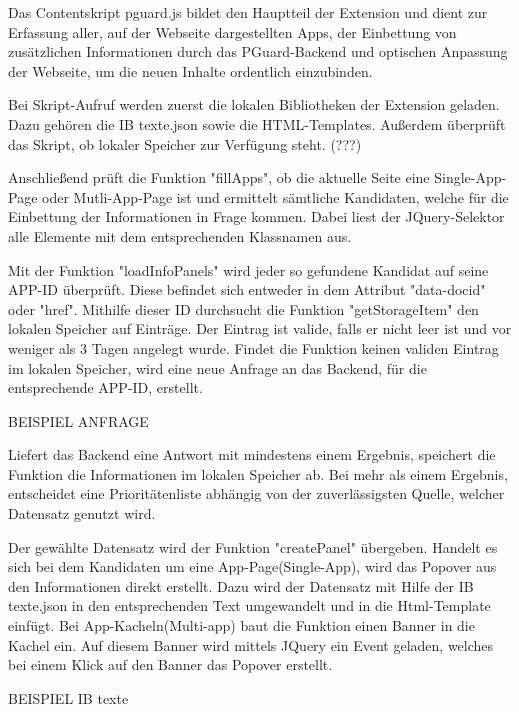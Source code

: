 

Das Contentskript pguard.js bildet den Hauptteil der Extension und dient zur Erfassung aller, auf der Webseite dargestellten Apps, der Einbettung von zusätzlichen Informationen durch das PGuard-Backend und optischen Anpassung der Webseite, um die neuen Inhalte ordentlich einzubinden.

Bei Skript-Aufruf werden zuerst die lokalen Bibliotheken der Extension geladen. Dazu gehören die IB texte.json sowie die HTML-Templates. Außerdem überprüft das Skript, ob lokaler Speicher zur Verfügung steht. (???)

Anschließend prüft die Funktion "fillApps", ob die aktuelle Seite eine Single-App-Page oder Mutli-App-Page ist und ermittelt sämtliche Kandidaten, welche für die Einbettung der Informationen in Frage kommen. Dabei liest der JQuery-Selektor alle Elemente mit dem entsprechenden Klassnamen aus.

Mit der Funktion "loadInfoPanels" wird jeder so gefundene Kandidat auf seine APP-ID überprüft. Diese befindet sich entweder in dem Attribut "data-docid" oder "href". Mithilfe dieser ID durchsucht die Funktion "getStorageItem" den lokalen Speicher auf Einträge. Der  Eintrag ist valide, falls er nicht leer ist und vor weniger als 3 Tagen angelegt wurde. Findet die Funktion keinen validen Eintrag im lokalen Speicher, wird eine neue Anfrage an das Backend, für die entsprechende APP-ID, erstellt.

BEISPIEL ANFRAGE

Liefert das Backend eine Antwort mit mindestens einem Ergebnis, speichert die Funktion die Informationen im lokalen Speicher ab. Bei mehr als einem Ergebnis, entscheidet eine Prioritätenliste abhängig von der zuverlässigsten Quelle, welcher Datensatz genutzt wird.

Der gewählte Datensatz wird der Funktion "createPanel" übergeben. Handelt es sich bei dem Kandidaten um eine App-Page(Single-App), wird das Popover aus den Informationen direkt erstellt. Dazu wird der Datensatz mit Hilfe der IB texte.json in den entsprechenden Text umgewandelt und in die Html-Template einfügt.
Bei App-Kacheln(Multi-app) baut die Funktion einen Banner in die Kachel ein. Auf diesem Banner wird mittels JQuery ein Event geladen, welches bei einem Klick auf den Banner das Popover erstellt.

BEISPIEL IB texte


